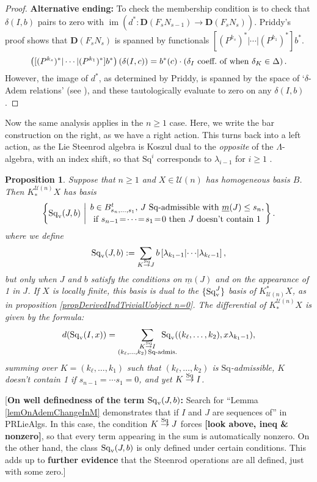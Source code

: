 \documentclass[11pt]{amsart}
\theoremstyle{plain}
\newtheorem{prop}[thm]{Proposition}
\theoremstyle{definition}
\DeclareMathOperator{\im}{im}
\renewcommand{\to}{\longrightarrow}
\newcommand{\calU}{\mathcal{U}}
\theoremstyle{plain}
\newcommand{\deltaalg}{\Delta} %
\newcommand{\minDimSq}{\underline{m}}
\newcommand{\produces}[3]{#3:#1\sim #2}
\renewcommand{\produces}[3]{#1\rightarrow_{#3} #2}%
\renewcommand{\produces}[3]{#1\overset{\smash{#3}}{\rightarrow} #2}%
\newcommand{\Sq}{\mathrm{Sq}}
\newcommand{\Sqv}{\mathrm{Sq}_\textup{v}}
\newcommand{\dual}{\mathbf{D}}
\begin{document}
\begin{Koszul complexes}
\begin{proof}
\textbf{Alternative ending: }To check the membership condition is to check that $\delta(I,b)$ pairs to zero with $\im(d^*:\dual(F_sN_{s-1})\to\dual(F_sN_s))$. Priddy's proof shows that $\dual(F_sN_s)$ is spanned by functionals $[(P^{k_s})^*|\cdots |(P^{k_1})^*]b^*$. %
\[\left([(P^{k_s})^*|\cdots |(P^{k_1})^*]b^*\right)\left(\delta(I,c)\right)= b^*(c)\cdot\left(\textup{$\delta_I$ coeff.\ of when $\delta_K\in\deltaalg$}\right).\]
However, the image of $d^*$, as determined by Priddy, is spanned by the space of `$\delta$-Adem relations' (see \cite[Theorem 2.5 and proof]{PriddyKoszul.pdf}), and these tautologically evaluate to zero on any $\delta(I,b)$.
\end{proof}
Now the same analysis applies in the $n\geq1$ case. Here, we write the bar construction on the right, as we have a right action. This turns back into a left action, as the Lie Steenrod algebra is Koszul dual to the \emph{opposite} of the $\Lambda$-algebra, with an index shift, so that $\Sq^i$ corresponds to $\lambda_{i-1}$ for $i\geq1$ \cite[\S7.1]{PriddyKoszul.pdf}.
\begin{prop}\label{propDerivedIndTrivialUobject n at least 1}
Suppose that $n\geq1$ and $X\in\calU(n)$ has homogeneous basis $B$. Then $K_*^{\calU(n)}X$ has basis
\[\left\{\Sq_{\textup{v}}(J,b)\ \middle|\ \genfrac{}{}{0pt}{}{b\in B_{s_{n},\ldots,s_1}^t\textup{, $J$ $\Sq$-admissible with }\minDimSq(J)\leq s_n,}{\textup{if }s_{n-1}\!=\!\cdots\!=\!s_1\!=\!0\textup{ then $J$ doesn't contain 1}}\right\}.\]
where we define
\[\Sqv(J,b):=
\sum_{\produces{K}{J}{\Sq}}b\left[\lambda_{k_1-1} \middle|\cdots\middle|\lambda_{k_\ell-1} \right],\]
but only when $J$ and $b$ satisfy the conditions on $\minDimSq(J)$ and on the appearance of 1 in $J$.
If $X$ is locally finite, this basis is dual to the $\{\Sqv^J\}$ basis of $K^*_{\calU(n)}X$, as in proposition \ref{propDerivedIndTrivialUobject n=0}. The differential of $K^{\calU(n)}_*X$ is given by the formula:
\[d(\Sqv(I,x))=\sum_{ \substack{\produces{K}{I}{\Sq}\\(k_{\ell},\ldots,k_2){\,\Sq\textup{-admis.}}}}\!\!\!\!\!\!\!\!\!\!\!\! \Sqv((k_{\ell},\ldots,k_2),x\lambda_{k_1-1}),\]
summing over $K=(k_{\ell},\ldots,k_1)$ such that $(k_{\ell},\ldots,k_2)$ is $\Sq$-admissible, $K$ doesn't contain 1 if $s_{n-1}=\cdots s_1=0$, and yet $\produces{K}{I}{\Sq}$.
\end{prop}
[\textbf{On well definedness of the term $\Sqv(J,b)$:} {Search for }``Lemma \ref{lemOnAdemChangeInM} demonstrates that if $I$ and $J$ are sequences of'' in PRLieAlgs.
In this case, the condition $\produces{K}{J}{\Sq}$ forces \textbf{[look above, ineq \& nonzero]}, so that every term appearing in the sum is automatically nonzero. On the other hand, the class $\Sqv(J,b)$ is only defined under certain conditions. This adds up to \textbf{further evidence} that the Steenrod operations are all defined, just with some zero.]

\end{Koszul complexes}
\end{document}
